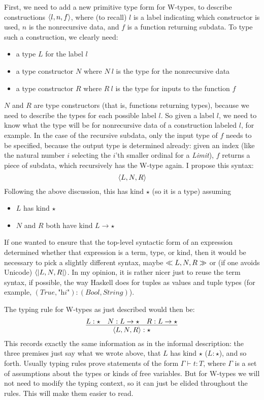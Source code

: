 \documentclass{article}
\begin{document}
First, we need to add a new primitive type form for W-types, to describe
constructions $\langle l , n, f \rangle$, where (to recall) $l$ is a label indicating
which constructor is used, $n$ is the nonrecursive data, and
$f$ is a function returning subdata.  To type such a construction, we
clearly need:
\begin{itemize}
\item a type $L$ for the label $l$
\item a type constructor $N$ where $N\ l$ is the type for the nonrecursive data
\item a type constructor $R$ where $R\ l$ is the type for inputs to the function $f$
\end{itemize}
\noindent $N$ and $R$ are type constructors (that is, functions returning types), because
we need to describe the types for each possible label $l$.  So given a label $l$, we need
to know what the type will be for nonrecursive data of a construction labeled $l$, for example.
In the case of the recursive subdata, only the input type of $f$ needs to be specified, because the output
type is determined already: given an index (like the natural number $i$ selecting the $i$'th smaller
ordinal for a \textit{Limit}), $f$ returns a piece of subdata, which recursively
has the W-type again.  I propose this syntax:
\[
\langle L , N , R \rangle
\]
\noindent Following the above discussion, this has kind $\star$ (so it is a type) assuming
\begin{itemize}
\item $L$ has kind $\star$
\item $N$ and $R$ both have kind $L \to \star$
\end{itemize}

\noindent If one wanted to ensure that the top-level syntactic form of an expression
determined whether that expression is a term, type, or kind, then it would be necessary
to pick a slightly different syntax, maybe $\ll L , N , R \gg$ or (if one avoids Unicode) $\langle| L , N , R |\rangle$.
In my opinion, it is rather nicer just to reuse the term syntax, if possible, the way
Haskell does for tuples as values and tuple types (for example, $(\textit{True},\textit{"hi"}) : (\textit{Bool},\textit{String})$).

The typing rule for W-types as just described would then be:
\[
\infer{ \w{L}{N}{R} : \star}{L : \star & N : L \to \star  & R : L \to \star }
\]
\noindent This records exactly the same information as in the informal
description: the three premises just say what we wrote above, that $L$
has kind $\star$ ($L : \star$), and so forth.  Usually typing rules
prove statements of the form $\Gamma \vdash t : T$, where $\Gamma$ is
a set of assumptions about the types or kinds of free variables.  But
for W-types we will not need to modify the typing context, so it can
just be elided throughout the rules.  This will make them easier to
read.
\end{document}
